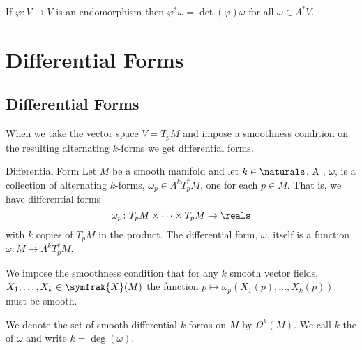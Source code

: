\documentclass[fleqn]{NotesClass}
\newcommand{\vectorFields}{\symfrak{X}}
\begin{document}
    \begin{lma}{}{}
        If \(\varphi \colon V \to V\) is an endomorphism then \(\varphi^*\omega = \det(\varphi) \omega\) for all \(\omega \in \Lambda^* V\).
    \end{lma}
    
    \chapter{Differential Forms}
    \section{Differential Forms}
    When we take the vector space \(V = T_pM\) and impose a smoothness condition on the resulting alternating \(k\)-forms we get differential forms.
    
    \begin{dfn}{Differential Form}{}
        Let \(M\) be a smooth manifold and let \(k \in \naturals\).
        A , \(\omega\), is a collection of alternating \(k\)-forms, \(\omega_p \in \Lambda^k T_p^*M\), one for each \(p \in M\).
        That is, we have differential forms
        \begin{equation}
            \omega_p \colon T_pM \times \dotsb \times T_pM \to \reals
        \end{equation}
        with \(k\) copies of \(T_pM\) in the product.
        The differential form, \(\omega\), itself is a function \(\omega \colon M \to \Lambda^kT_p^*M\).
        
        We impose the smoothness condition that for any \(k\) smooth vector fields, \(X_1, \dotsc, X_k \in \vectorFields(M)\) the function \(p \mapsto \omega_p(X_1(p), \dotsc, X_k(p))\) must be smooth.
        
        We denote the set of smooth differential \(k\)-forms on \(M\) by \(\Omega^k(M)\).
        We call \(k\) the  of \(\omega\) and write \(k = \deg(\omega)\).
    \end{dfn}
    
\end{document}
